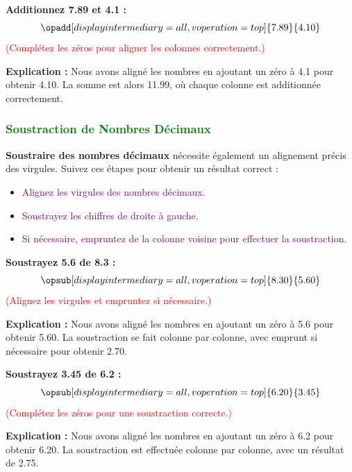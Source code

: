 \documentclass{article}
\begin{document}
\begin{tcolorbox}[colback=orange!10!white, colframe=orange!75!black, sharp corners=south, boxrule=0.8mm, title=Exemple d'Addition]
    \textbf{Additionnez 7.89 et 4.1 :}
    \[
    \opadd[displayintermediary=all,voperation=top]{7.89}{4.10}
    \]
    \textcolor{red}{(Complétez les zéros pour aligner les colonnes correctement.)}
    
    \textbf{Explication :} Nous avons aligné les nombres en ajoutant un zéro à 4.1 pour obtenir 4.10. La somme est alors 11.99, où chaque colonne est additionnée correctement.
\end{tcolorbox}

\subsubsection{\textcolor{green}{Soustraction de Nombres Décimaux}}

\vspace{0.25cm}

\textbf{Soustraire des nombres décimaux} nécessite également un alignement précis des virgules. Suivez ces étapes pour obtenir un résultat correct :

    \begin{itemize}
        \item \textcolor{purple}{Alignez les virgules des nombres décimaux.}
        \item \textcolor{purple}{Soustrayez les chiffres de droite à gauche.}
        \item \textcolor{purple}{Si nécessaire, empruntez de la colonne voisine pour effectuer la soustraction.}
    \end{itemize}

\vspace{0.2cm}

\begin{tcolorbox}[colback=orange!10!white, colframe=orange!75!black, sharp corners=south, boxrule=0.8mm, title=Exemple de Soustraction]
    \textbf{Soustrayez 5.6 de 8.3 :}
    \[
    \opsub[displayintermediary=all,voperation=top]{8.30}{5.60}
    \]
    \textcolor{red}{(Alignez les virgules et empruntez si nécessaire.)}
    
    \textbf{Explication :} Nous avons aligné les nombres en ajoutant un zéro à 5.6 pour obtenir 5.60. La soustraction se fait colonne par colonne, avec emprunt si nécessaire pour obtenir 2.70.
\end{tcolorbox}

\begin{tcolorbox}[colback=orange!10!white, colframe=orange!75!black, sharp corners=south, boxrule=0.8mm, title=Exemple de Soustraction]
    \textbf{Soustrayez 3.45 de 6.2 :}
    \[
    \opsub[displayintermediary=all,voperation=top]{6.20}{3.45}
    \]
    \textcolor{red}{(Complétez les zéros pour une soustraction correcte.)}
    
    \textbf{Explication :} Nous avons aligné les nombres en ajoutant un zéro à 6.2 pour obtenir 6.20. La soustraction est effectuée colonne par colonne, avec un résultat de 2.75.
\end{tcolorbox}
\end{document}
